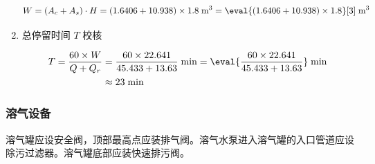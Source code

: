 \begin{enumerate}
	\begin{align}
		W= (A_c+A_s)\cdot H = (1.6406+10.938)\times 1.8 \;\text{m$^3$} = \eval{(1.6406+10.938)\times 1.8}[3] \;\text{m$^3$}
	\end{align}

	\item 总停留时间 $T$ 校核
	
	\begin{align}
		T=\dfrac{60\times W}{Q+Q_r} &= \dfrac{60\times 22.641}{45.433 + 13.63} \;\text{min} = \eval{\dfrac{60\times 22.641}{45.433 + 13.63}} \;\text{min} \\
		&\approx 23 \;\text{min} \notag
	\end{align}
\end{enumerate}




\subsubsection{溶气设备}
溶气罐应设安全阀，顶部最高点应装排气阀。溶气水泵进入溶气罐的入口管道应设除污过滤器。溶气罐底部应装快速排污阀。

